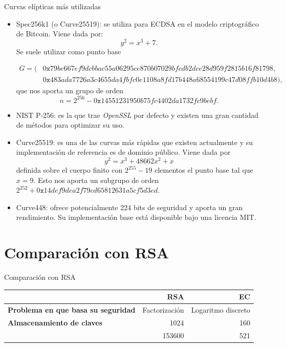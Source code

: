 \documentclass[12pt]{beamer}
\begin{document}
\begin{frame}[fragile, allowframebreaks=0.8]{Curvas elípticas más utilizadas}
  \begin{itemize}
\item Spec256k1 (o Curve25519): se utiliza para ECDSA en el modelo criptográfico de Bitcoin. Viene dada por:
\[
y^2 = x^3 + 7.
\]
Se suele utilizar como punto base

\begin{align*}
G = (&0\texttt{x}79be667ef9dcbbac55a06295ce870b07029bfcdb2dce28d959f2815b16f81798, \\
		&0\texttt{x}483ada7726a3c4655da4fbfc0e1108a8fd17b448a68554199c47d08ffb10d4b8),
\end{align*}
que nos aporta un grupo de orden
\[
n =2^{256}-0\texttt{x}14551231950b75fc4402da1732fc9bebf.
\]

\item NIST P-256: es la que trae \textit{OpenSSL} por defecto y existen una gran cantidad de métodos para optimizar su uso. \\

\item Curve25519: es una de las curvas más rápidas que existen actualmente y su implementación de referencia es de dominio público. Viene dada por
\[
y^2 = x^3 + 48662x^2 + x
\]
definida sobre el cuerpo finito con $ 2^{255} - 19 $ elementos el punto base tal que $ x = 9 $. Esto nos aporta un subgrupo de orden $ 2^{252 }+ 0\texttt{x}14def9dea2f79cd65812631a5cf5d3ed$. \\

\item  Curve448: ofrece potencialmente 224 bits de seguridad y aporta un gran rendimiento. Su implementación base está disponible bajo una licencia MIT. \\
\end{itemize}

\end{frame}

\section{Comparación con RSA}\label{rsa}
\begin{frame}[fragile]{Comparación con RSA}
  \begin{table}[H]
	  \centering
	  \begin{adjustbox}{width=\textwidth}
	\begin{tabular}{lrr}
	  \toprule
	   & \textbf{RSA} & \textbf{EC} \\
	  \midrule
	  \textbf{Problema en que basa su seguridad} & Factorización & Logaritmo discreto\\
	  \textbf{Almacenamiento de claves} & 1024 & 160\\
           & 153600 & 521 \\
	  \bottomrule
	\end{tabular}
	\end{adjustbox}
	\end{table}
\end{frame}
\end{document}
